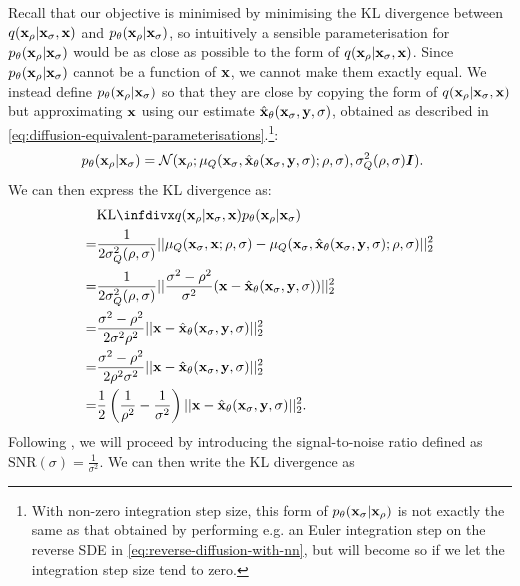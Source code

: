 Recall that our objective is minimised by minimising the KL divergence between $q({\mathbf{x}}_\rho|{\mathbf{x}}_\sigma,{\mathbf{x}})$ and $p_\theta({\mathbf{x}}_{\rho}|{\mathbf{x}}_{\sigma})$, so intuitively a sensible parameterisation for $p_\theta({\mathbf{x}}_\rho|{\mathbf{x}}_\sigma)$ would be as close as possible to the form of $q({\mathbf{x}}_\rho|{\mathbf{x}}_\sigma,{\mathbf{x}})$. Since $p_\theta({\mathbf{x}}_{\rho}|{\mathbf{x}}_{\sigma})$ cannot be a function of ${\mathbf{x}}$, we cannot make them exactly equal. We instead define $p_\theta({\mathbf{x}}_\rho|{\mathbf{x}}_\sigma)$ so that they are close by copying the form of $q({\mathbf{x}}_\rho|{\mathbf{x}}_\sigma,{\mathbf{x}})$ but approximating ${\mathbf{x}}$ using our estimate $\hat{{\mathbf{x}}}_\theta({\mathbf{x}}_\sigma, {\mathbf{y}}, \sigma)$, obtained as described in \cref{eq:diffusion-equivalent-parameterisations}.\footnote{With non-zero integration step size, this form of $p_\theta({\mathbf{x}}_{\sigma} | {\mathbf{x}}_{\rho})$ is not exactly the same as that obtained by performing e.g. an Euler integration step on the reverse SDE in \cref{eq:reverse-diffusion-with-nn}, but will become so if we let the integration step size tend to zero.}:
\begin{align}
    p_\theta({\mathbf{x}}_{\rho} | {\mathbf{x}}_{\sigma}) &= {\mathcal{N}}( {\mathbf{x}}_{\rho}; \mathbf{\mu}_Q({\mathbf{x}}_\sigma, \hat{{\mathbf{x}}}_\theta({\mathbf{x}}_\sigma, {\mathbf{y}}, \sigma); \rho, \sigma), \sigma_Q^2(\rho, \sigma) {\bm{I}} ).
\end{align}
We can then express the KL divergence as:
\begin{align}
    &\kl{q(\rvx_{\rho} | \rvx_{\sigma}, \rvx)}{p_\theta(\rvx_{\rho} | \rvx_{\sigma})} \\ 
    = &\frac{1}{2 \sigma_Q^2(\rho, \sigma)} || \mathbf{\mu}_Q(\rvx_\sigma, \rvx; \rho, \sigma) - \mathbf{\mu}_Q(\rvx_\sigma, \hat{\rvx}_\theta(\rvx_\sigma, \rvy, \sigma); \rho, \sigma) ||_2^2 \\
    = &\frac{1}{2 \sigma_Q^2(\rho, \sigma)} || \frac{\sigma^2-\rho^2}{\sigma^2} ( \rvx - \hat{\rvx}_\theta(\rvx_\sigma, \rvy, \sigma) ) ||_2^2 \\
    = &\frac{\sigma^2-\rho^2}{2 \sigma^2 \rho^2} || \rvx - \hat{\rvx}_\theta(\rvx_\sigma, \rvy, \sigma) ||_2^2 \\
    = &\frac{\sigma^2 - \rho^2}{2 \rho^2 \sigma^2} || \rvx - \hat{\rvx}_\theta(\rvx_\sigma, \rvy, \sigma) ||_2^2 \\
    = &\frac{1}{2} \left( \frac{1}{\rho^2} - \frac{1}{\sigma^2} \right) || \rvx - \hat{\rvx}_\theta(\rvx_\sigma, \rvy, \sigma) ||_2^2.
\end{align}
Following \citet{kingma2021variational}, we will proceed by introducing the signal-to-noise ratio defined as $\text{SNR}(\sigma) = \frac{1}{\sigma^2}$. We can then write the KL divergence as
